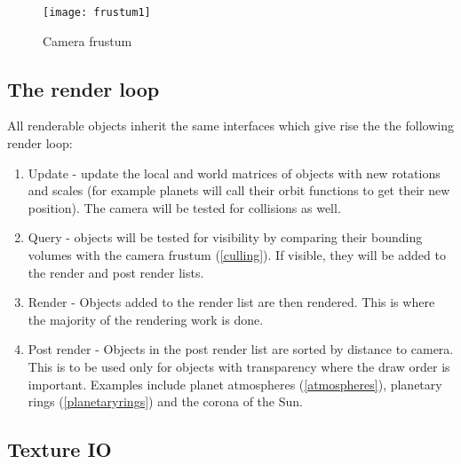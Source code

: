 \begin{figure}[!htbp]
  \begin{center}
    \leavevmode
    \ifpdf
      \texttt{[image: frustum1]}
    \fi
    \caption{Camera frustum}
    \label{FigFrustum}
  \end{center}
\end{figure}

\subsection{The render loop}

All renderable objects inherit the same interfaces which give rise the the following render loop:

\begin{enumerate}
\item Update - update the local and world matrices of objects with new rotations and scales (for example planets will call their orbit functions to get their new position). The camera will be tested for collisions as well.
\item Query - objects will be tested for visibility by comparing their bounding volumes with the camera frustum (\cref{culling}). If visible, they will be added to the render and post render lists.
\item Render - Objects added to the render list are then rendered. This is where the majority of the rendering work is done.
\item Post render - Objects in the post render list are sorted by distance to camera. This is to be used only for objects with transparency where the draw order is important. Examples include planet atmospheres (\cref{atmospheres}), planetary rings (\cref{planetaryrings}) and the corona of the Sun.   
\end{enumerate}

\subsection{Texture IO}

